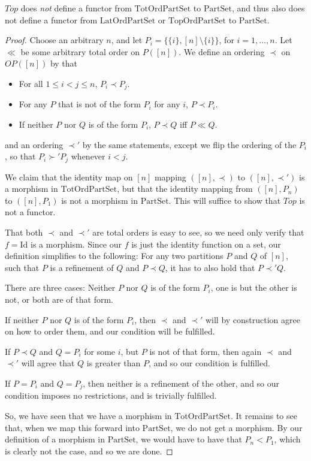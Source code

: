 \documentclass[a4paper,reqno,oneside]{article} %
\begin{document}
\begin{remark}\label{remark_top_not_functor}
$Top$ does \emph{not} define a functor from $\mathrm{TotOrdPartSet}$ to $\mathrm{PartSet}$, and thus also does not define a functor from $\mathrm{LatOrdPartSet}$ or $\mathrm{TopOrdPartSet}$ to $\mathrm{PartSet}$.
\begin{proof}
Choose an arbitrary $n$, and let $P_i = \{\{i\},[n]\setminus \{i\}\}$, for $i = 1, \ldots, n$. Let $\ll$ be some arbitrary total order on $P([n])$. We define an ordering $\prec$ on $OP([n])$ by that
\begin{itemize}
    \item For all $1\leq i < j \leq n$, $P_i \prec P_j$.
    \item For any $P$ that is not of the form $P_i$ for any $i$, $P \prec P_i$.
    \item If neither $P$ nor $Q$ is of the form $P_i$, $P \prec Q$ iff $P \ll Q$.
\end{itemize}
and an ordering $\prec'$ by the same statements, except we flip the ordering of the $P_i$, so that $P_i \succ' P_j$ whenever $i < j$.

We claim that the identity map on $[n]$ mapping $([n],\prec)$ to $([n],\prec')$ is a morphism in $\mathrm{TotOrdPartSet}$, but that the identity mapping from $([n], P_n)$ to $([n],P_1)$ is not a morphism in $\mathrm{PartSet}$. This will suffice to show that $Top$ is not a functor.

That both $\prec$ and $\prec'$ are total orders is easy to see, so we need only verify that $f = \mathrm{Id}$ is a morphism. Since our $f$ is just the identity function on a set, our definition simplifies to the following: For any two partitions $P$ and $Q$ of $[n]$, such that $P$ is a refinement of $Q$ and $P \prec Q$, it has to also hold that $P \prec' Q$.

There are three cases: Neither $P$ nor $Q$ is of the form $P_i$, one is but the other is not, or both are of that form.

If neither $P$ nor $Q$ is of the form $P_i$, then $\prec$ and $\prec'$ will by construction agree on how to order them, and our condition will be fulfilled.

If $P \prec Q$ and $Q = P_i$ for some $i$, but $P$ is not of that form, then again $\prec$ and $\prec'$ will agree that $Q$ is greater than $P$, and so our condition is fulfilled.

If $P = P_i$ and $Q = P_j$, then neither is a refinement of the other, and so our condition imposes no restrictions, and is trivially fulfilled.

So, we have seen that we have a morphism in $\mathrm{TotOrdPartSet}$. It remains to see that, when we map this forward into $\mathrm{PartSet}$, we do not get a morphism. By our definition of a morphism in $\mathrm{PartSet}$, we would have to have that $P_n < P_1$, which is clearly not the case, and so we are done. 
\end{proof}
\end{remark}
\end{document}
